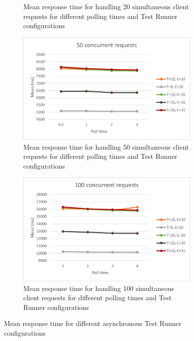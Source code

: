 \begin{figure}[H]
\begin{subfigure}[b]{0.45\textwidth}
    \caption{Mean response time for handling 20 simultaneous client requests for different polling times and Test Runner configurations}
  \end{subfigure}
  \hfill
  \begin{subfigure}[b]{0.45\textwidth}
    \centering
    \includegraphics[width=\textwidth]{images/50.png}
    \caption{Mean response time for handling 50 simultaneous client requests for different polling times and Test Runner configurations}
  \end{subfigure}
  \hfill
  \begin{subfigure}[b]{0.45\textwidth}
    \centering
    \includegraphics[width=\textwidth]{images/100.png}
    \caption{Mean response time for handling 100 simultaneous client requests for different polling times and Test Runner configurations}
    \label{fig:resultEnd}
  \end{subfigure}
\caption{Mean response time for different asynchronous Test Runner configurations}
\label{fig:configResults}
\end{figure}


